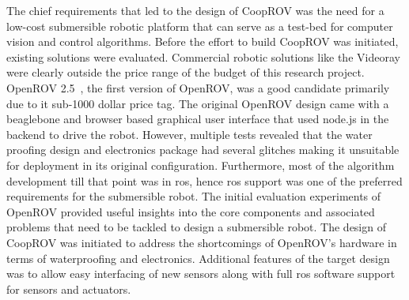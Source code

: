 \documentclass {udthesis}
\begin{document}
The chief requirements that led to the design of CoopROV was the need for a low-cost submersible robotic platform that can serve as a test-bed for computer vision and control algorithms. Before the effort to build CoopROV was initiated, existing solutions were evaluated. Commercial robotic solutions like the Videoray were clearly outside the price range of the budget of this research project. OpenROV 2.5~\cite{openrov}, the first version of OpenROV, was a good candidate primarily due to it sub-1000 dollar price tag. The original OpenROV design came with a beaglebone and browser based graphical user interface that used node.js \cite{nodejs} in the backend to drive the robot. However, multiple tests revealed that the water proofing design and electronics package had several glitches making it unsuitable for deployment in its original configuration. Furthermore, most of the algorithm development till that point was in \gls{ros}, hence \gls{ros} support was one of the 
preferred requirements for the submersible robot. The initial evaluation experiments of OpenROV provided useful insights into the core components and associated problems that need to be tackled to design a submersible robot. The design of CoopROV was initiated to address the shortcomings of OpenROV's hardware in terms of waterproofing and electronics. Additional features of the target design was to allow easy interfacing of new sensors along with full \gls{ros} software support for sensors and actuators.
\end{document}
